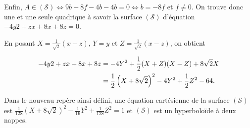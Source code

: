 {{Enfin, $A\in(\mathcal{S})\Leftrightarrow 9b+8f-4b-4b = 0\Leftrightarrow b = -8f$ et $f\neq0$. On trouve donc une et une seule quadrique à savoir la surface $(\mathcal{S})$ d'équation $-4y2+zx+8x+8z=0$.

En posant $X=\frac{1}{\sqrt{2}}(x+z)$, $Y=y$ et $Z=\frac{1}{\sqrt{2}}(x-z)$, on obtient

\begin{align*}\ensuremath
-4y2+zx+8x+8z&=-4Y^2+\frac{1}{2}(X+Z)(X-Z)+8\sqrt{2}X\\
 &=\frac{1}{2}\left(X+8\sqrt{2}\right)^2-4Y^2+\frac{1}{2}Z^2 - 64.
\end{align*}

Dans le nouveau repère ainsi défini, une équation cartésienne de la surface $(\mathcal{S})$ est $\frac{1}{128}\left(X+8\sqrt{2}\right)^2-\frac{1}{16}Y^2+\frac{1}{128}Z^2=1$ et $(\mathcal{S})$ est  un hyperboloïde à deux nappes.
}
}
